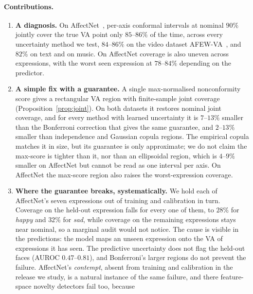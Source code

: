 \paragraph{Contributions.}
\begin{enumerate}
  \item \textbf{A diagnosis.} On AffectNet~\cite{mollahosseini2017affectnet},
        per-axis conformal intervals at nominal $90\%$ jointly cover the true VA
        point only $85$--$86\%$ of the time, across every uncertainty method we
        test, $84$--$86\%$ on the video dataset
        AFEW-VA~\cite{kossaifi2017afew}, and $82\%$ on text and on music. On AffectNet coverage is also uneven
        across expressions, with the worst seen expression at $78$--$84\%$
        depending on the predictor.
  \item \textbf{A simple fix with a guarantee.} A single max-normalised
        nonconformity score gives a rectangular VA region with finite-sample
        joint coverage (Proposition~\ref{prop:joint}). On both datasets it
        restores nominal joint coverage, and for every method with learned
        uncertainty it is $7$--$13\%$ smaller than the Bonferroni correction
        that gives the same guarantee, and $2$--$13\%$ smaller than
        independence and Gaussian copula regions. The empirical copula matches
        it in size, but its guarantee is only approximate; we do not claim the
        max-score is tighter than it, nor than an ellipsoidal region, which
        is $4$--$9\%$ smaller on AffectNet but cannot be read as one interval
        per axis. On AffectNet the max-score region also
        raises the worst-expression coverage.
  \item \textbf{Where the guarantee breaks, systematically.} We hold each of
        AffectNet's seven expressions out of training and calibration in turn.
        Coverage on the held-out expression falls for every one of them, to
        $28\%$ for \emph{happy} and $32\%$ for \emph{sad}, while
        coverage on the remaining expressions stays near nominal, so a marginal
        audit would not notice. The cause is visible in the predictions: the
        model maps an unseen expression onto the VA of expressions it has seen.
        The predictive uncertainty does not flag the held-out faces (AUROC
        $0.47$--$0.81$), and Bonferroni's larger regions do not prevent
        the failure. AffectNet's \emph{contempt}, absent from training and
        calibration in the release we study, is a natural instance of the same
        failure, and there feature-space novelty detectors fail too, because

\end{enumerate}
